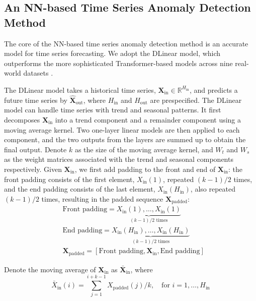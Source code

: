 \documentclass[11pt]{article}
\begin{document}


\subsection{An NN-based Time Series Anomaly Detection Method} 
 The core of the NN-based time series anomaly detection method is an accurate model for time series forecasting. We adopt the DLinear model, which outperforms the more sophisticated Transformer-based models across nine real-world datasets \citep{zeng2023transformers}.
 
The DLinear model takes a historical time series, $\bm{X}_{\mathrm{in}} \in \mathbb{R}^{H_{\mathrm{in}}}$, and predicts a future time series by $\hat{\bm{X}}_{\mathrm{out}}$, where $H_{\mathrm{in}}$ and $H_{\mathrm{out}}$ are prespecified. The DLinear model can handle time series with trend and seasonal patterns. It first decomposes $\bm{X}_{\mathrm{in}}$ into a trend component and a remainder component using a moving average kernel. Two one-layer linear models are then applied to each component, and the two outputs from the layers are summed up to obtain the final output. Denote $k$ as the size of the moving average kernel, and $W_{t}$ and $W_{s}$ as the weight matrices associated with the trend and seasonal components respectively. Given $\bm{X}_{\mathrm{in}}$, we first add padding to the front and end of $\bm{X}_{\mathrm{in}}$: the front padding consists of the first element, $X_{\mathrm{in}}(1)$, repeated $(k-1)/2$ times, and the end padding consists of the last element, $X_{\mathrm{in}}(H_{\mathrm{in}})$, also repeated $(k-1)/2$ times, resulting in the padded sequence $\bm{X}_{\mathrm{padded}}$:
\begin{align}
&\text{Front padding} = \underbrace{X_{\mathrm{in}}(1), \ldots, X_{\mathrm{in}}(1)}_{(k-1)/2 \text{ times}}\\
&\text{End padding} = \underbrace{X_{\mathrm{in}}(H_{\mathrm{in}}), \ldots, X_{\mathrm{in}}(H_{\mathrm{in}})}_{(k-1)/2 \text{ times}}\\
&\bm{X}_{\mathrm{padded}} = [\text{Front padding}, \bm{X}_{\mathrm{in}}, \text{End padding}]
\end{align}

Denote the moving average of $\bm{X}_{\mathrm{in}}$ as $\bar{\bm{X}}_{\mathrm{in}}$, where
\begin{equation}
	\bar{X}_{\mathrm{in}}(i) = \sum_{j=1}^{i+k-1}X_{\mathrm{padded}}(j)/k, \quad \text{for } i = 1, \ldots, H_{\mathrm{in}}
\end{equation}
\end{document}
